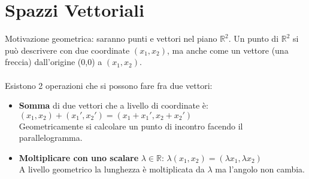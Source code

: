 \newpage
\section{Spazzi Vettoriali}
Motivazione geometrica: saranno punti e vettori nel piano $\mathbb{R}^2$. Un punto di $\mathbb{R}^2$ si può descrivere con due coordinate $(x_1,x_2)$, ma anche come un vettore (una freccia) dall'origine (0,0) a $(x_1, x_2)$.\\\\
Esistono 2 operazioni che si possono fare fra due vettori:
\begin{itemize}
    \item \textbf{Somma} di due vettori che a livello di coordinate è: $(x_1,x_2) + (x_1', x_2') = (x_1 + x_1', x_2 + x_2')$\\
    Geometricamente si calcolare un punto di incontro facendo il parallelogramma.
    \item \textbf{Moltiplicare con uno scalare} $\lambda \in \mathbb{R}$: $\lambda(x_1, x_2) = (\lambda x_1, \lambda x_2)$\\
    A livello geometrico la lunghezza è moltiplicata da $\lambda$ ma l'angolo non cambia.
\end{itemize}

